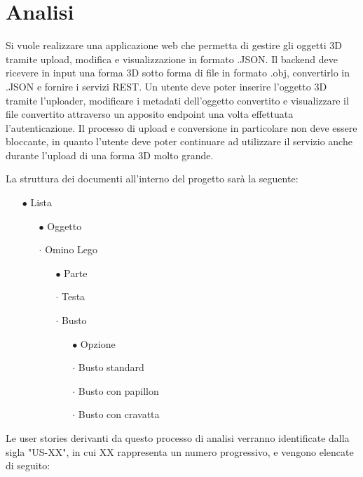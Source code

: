 \section{Analisi}
Si vuole realizzare una applicazione web che permetta di gestire gli oggetti 3D tramite upload, modifica e visualizzazione in formato .JSON.
Il backend deve ricevere in input una forma 3D sotto forma di file in formato .obj, convertirlo in .JSON e fornire i servizi REST.
Un utente deve poter inserire l'oggetto 3D tramite l'uploader, modificare i metadati dell'oggetto convertito e visualizzare il file convertito attraverso un apposito endpoint una volta effettuata l'autenticazione.
Il processo di upload e conversione in particolare non deve essere bloccante, in quanto l'utente deve poter continuare ad utilizzare il servizio anche durante l'upload di una forma 3D molto grande.

La struttura dei documenti all'interno del progetto sarà la seguente:
\begin{itemize}
	\item[$\bullet$] Lista
	\begin{itemize}
		\item[$\bullet$] Oggetto
		\item[$\cdot$] Omino Lego
		\begin{itemize}
			\item[$\bullet$] Parte
			\item[$\cdot$] Testa
			\item[$\cdot$] Busto
			\begin{itemize}
				\item[$\bullet$] Opzione
				\item[$\cdot$] Busto standard
				\item[$\cdot$] Busto con papillon
				\item[$\cdot$] Busto con cravatta
			\end{itemize}
		\end{itemize}
	\end{itemize}
\end{itemize}

Le user stories derivanti da questo processo di analisi verranno identificate dalla sigla "US-XX", in cui XX rappresenta un numero progressivo, e vengono elencate di seguito:

